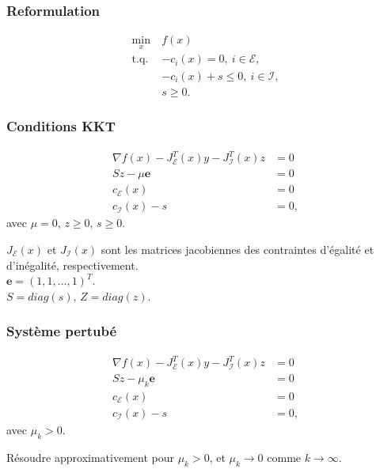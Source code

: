 \documentclass[usepdftitle=false]{beamer}
\def\cE{\mathcal{E}}
\def\cI{\mathcal{I}}
\def\be{\boldsymbol{e}}
\begin{document}
\begin{frame}
\frametitle{Reformulation}

\begin{align*}
\min_x \ & f(x) \\
\mbox{t.q. } & -c_i(x) = 0,\ i \in \cE, \\
& - c_i(x) + s \leq 0,\ i \in \cI, \\
& s \geq 0.
\end{align*}

\end{frame}

\begin{frame}
\frametitle{Conditions KKT}

\begin{align*}
\nabla f(x) - J^T_{\cE}(x) y - J^T_{\cI} (x) z &= 0 \\
Sz - \mu \be &= 0 \\
c_{\cE}(x) &= 0 \\
c_{\cI}(x) - s &= 0,
\end{align*}
avec $\mu = 0$, $z \geq 0$, $s \geq 0$.

\mbox{}

$J_{\cE}(x)$ et $J_{\cI}(x)$ sont les matrices jacobiennes des contraintes d'égalité et d'inégalité, respectivement.\\
$\be = (1, 1,\ldots, 1)^T$. \\
$S = diag(s)$, $Z = diag(z)$.

\end{frame}

\begin{frame}
\frametitle{Système pertubé}

\begin{align*}
\nabla f(x) - J^T_{\cE}(x) y - J^T_{\cI} (x) z &= 0 \\
Sz - \mu_k \be &= 0 \\
c_{\cE}(x) &= 0 \\
c_{\cI}(x) -s &= 0,
\end{align*}
avec $\mu_k > 0$.

\mbox{}

Résoudre approximativement pour $\mu_k > 0$, et $\mu_k \rightarrow 0$ comme $k \rightarrow \infty$.

\end{frame}
\end{document}
